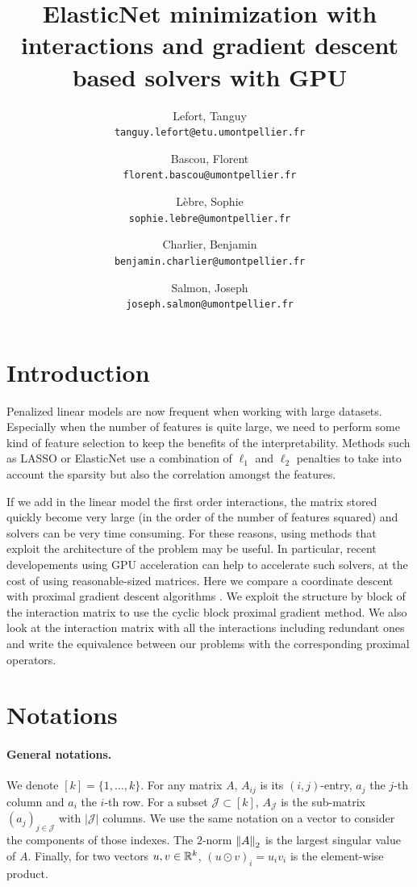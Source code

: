 \documentclass[a4]{article}
\title{ElasticNet minimization with interactions and gradient descent based solvers with GPU}
\author{
  Lefort, Tanguy\\
  \texttt{tanguy.lefort@etu.umontpellier.fr}
  \and
  Bascou, Florent\\
  \texttt{florent.bascou@umontpellier.fr}
  \and
  Lèbre, Sophie\\
  \texttt{sophie.lebre@umontpellier.fr}
  \and
  Charlier, Benjamin\\
  \texttt{benjamin.charlier@umontpellier.fr}
  \and
  Salmon, Joseph\\
  \texttt{joseph.salmon@umontpellier.fr}
}
\begin{document}
\maketitle


\section*{Introduction}

Penalized linear models are now frequent when working with large datasets. Especially when the number of features is quite large,
we need to perform some kind of feature selection to keep the benefits of the interpretability.
Methods such as LASSO \citep{Tibshirani96} or ElasticNet \citep{Zou_Hastie05} use a combination of $\ell_1$ and $\ell_2$ penalties to take into account the sparsity but also the correlation amongst the features.

\medskip

If we add in the linear model the first order interactions, the matrix stored quickly become very large (in the order of the number of features squared) and
solvers can be very time consuming. For these reasons, using methods that exploit the architecture of the problem may be useful.
In particular, recent developements using GPU acceleration can help to accelerate such solvers, at the cost of using reasonable-sized matrices.
Here we compare a coordinate descent \citep{Bascou_Lebre_Salmon20} with proximal gradient descent algorithms \citep{Beck17}.
We exploit the structure by block of the interaction matrix to use the cyclic block proximal gradient method.
We also look at the interaction matrix with all the interactions including redundant ones and write the equivalence between our problems with the corresponding proximal operators.


\section*{Notations}

\paragraph{General notations.}
We denote $[k]=\{1, \dots, k\}$. For any matrix $A$, $A_{ij}$ is its $(i,j)$-entry, $a_j$ the $j$-th column
and $a_i$ the $i$-th row. For a subset $\mathcal{J} \subset [k]$, $A_{\mathcal{J}}$ is the sub-matrix $(a_j)_{j\in \mathcal{J}}$ with $|\mathcal{J}|$ columns.
We use the same notation on a vector to consider the components of those indexes.
The $2$-norm $\left \lVert A \right \rVert_2$ is the largest singular value of $A$. Finally, for two vectors $u,v\in\mathbb{R}^k$, $(u\odot v)_i=u_iv_i$ is the element-wise product.
\end{document}
